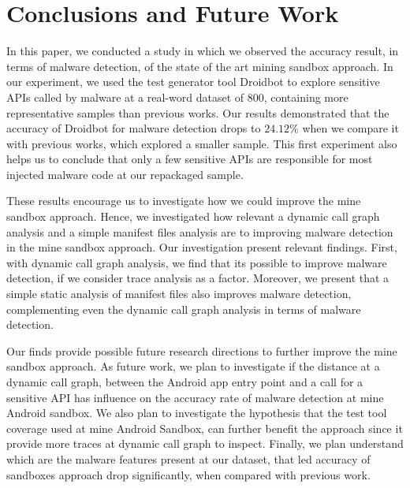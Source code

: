 \section{Conclusions and Future Work}\label{sec:conclusions}


In this paper, we conducted a study in which we observed the accuracy result, in terms of malware detection, of the state of the art mining sandbox approach. In our experiment, we used the test generator tool Droidbot to explore sensitive APIs called by malware at a real-word dataset of $800$, containing more representative samples than previous works. Our results demonstrated that the accuracy of Droidbot for malware detection drops to $24.12\%$ when we compare it with previous works, which explored a smaller sample. This first experiment also helps us to conclude that only a few sensitive APIs are responsible for most injected malware code at our repackaged sample.

These results encourage us to investigate how we could improve the mine sandbox approach. Hence, we investigated how relevant a dynamic call graph analysis and a simple manifest files analysis are to improving malware detection in the mine sandbox approach. Our investigation present relevant findings. First, with dynamic call graph analysis, we find that its possible to improve malware detection, if we consider trace analysis as a factor. Moreover, we present that a simple static analysis of manifest files also improves malware detection, complementing even the dynamic call graph analysis in terms of malware detection.

Our finds provide possible future research directions to further improve the mine sandbox approach. As future work, we plan to investigate if the distance at a dynamic call graph, between the Android app entry point and a call for a sensitive API has influence on the accuracy rate of malware detection at mine Android sandbox. We also plan to investigate the hypothesis that the test tool coverage used at mine Android Sandbox, can further benefit the approach since it provide more traces at dynamic call graph to inspect. Finally, we plan understand which are the malware features present at our dataset, that led accuracy of sandboxes approach drop significantly, when compared with previous work.
